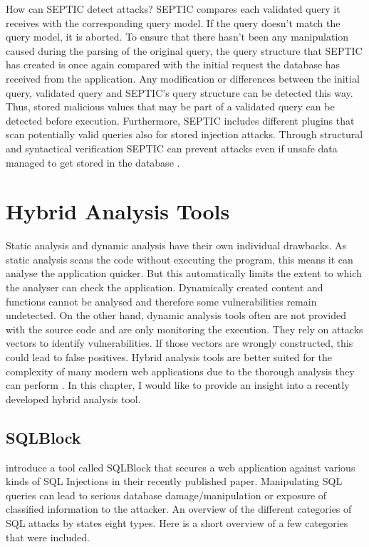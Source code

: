 How can SEPTIC detect attacks? SEPTIC compares each validated query it receives with the corresponding query model. If the query doesn't match the query model, it is aborted. To ensure that there hasn't been any manipulation caused during the parsing of the original query, the query structure that SEPTIC has created is once again compared with the initial request the database has received from the application. Any modification or differences between the initial query, validated query and SEPTIC's query structure can be detected this way. Thus, stored malicious values that may be part of a validated query can be detected before execution. Furthermore, SEPTIC includes different plugins that scan potentially valid queries also for stored injection attacks. Through structural and syntactical verification SEPTIC can prevent attacks even if unsafe data managed to get stored in the database \autocite[1173-1175]{Medeiros2019}.

\section{Hybrid Analysis Tools}
Static analysis and dynamic analysis have their own individual drawbacks. As static analysis scans the code without executing the program, this means it can analyse the application quicker. But this automatically limits the extent to which the analyser can check the application. Dynamically created content and functions cannot be analysed and therefore some vulnerabilities remain undetected. On the other hand, dynamic analysis tools often are not provided with the source code and are only monitoring the execution. They rely on attacks vectors to identify vulnerabilities. If those vectors are wrongly constructed, this could lead to false positives.
Hybrid analysis tools are better suited for the complexity of many modern web applications due to the thorough analysis they can perform \autocite[]{Araujo2018, Jahanshahi2018}. In this chapter, I would like to provide an insight into a recently developed hybrid analysis tool.\newline


\subsection{SQLBlock}

\textcite[]{Jahanshahi2018} introduce a tool called SQLBlock that secures a web application against various kinds of SQL Injections in their recently published paper. Manipulating SQL queries can lead to serious database damage/manipulation or exposure of classified information to the attacker. An overview of the different categories of SQL attacks by \textcite[3ff.]{Halfond2008} states eight types. Here is a short overview of a few categories that were included.\newline


